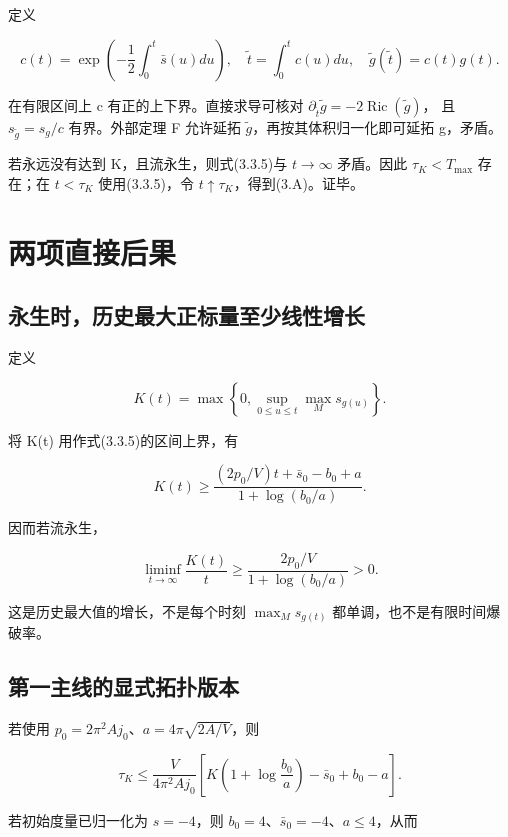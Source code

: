 \documentclass[UTF8,11pt,fontset=none]{ctexart}
\theoremstyle{definition}
\theoremstyle{remark}
\begin{document}
定义

\[
 c(t)=\exp\left(-\frac12\int_0^t\bar s(u)du\right),
 \quad \widetilde t=\int_0^t c(u)du,
 \quad \widetilde g(\widetilde t)=c(t)g(t).
\]

在有限区间上 c 有正的上下界。直接求导可核对 \(\partial_{\widetilde t}\widetilde g=-2\operatorname{Ric}(\widetilde g)\)， 且 \(s_{\widetilde g}=s_g/c\) 有界。外部定理 F 允许延拓 \(\widetilde g\)，再按其体积归一化即可延拓 g，矛盾。

若永远没有达到 K，且流永生，则式(3.3.5)与 \(t\to\infty\) 矛盾。因此 \(\tau_K<T_{\max}\) 存在；在 \(t<\tau_K\) 使用(3.3.5)，令 \(t\uparrow\tau_K\)，得到(3.A)。证毕。

\section{两项直接后果}\label{v3-ux4e24ux9879ux76f4ux63a5ux540eux679c}

\subsection{永生时，历史最大正标量至少线性增长}\label{v3-ux6c38ux751fux65f6ux5386ux53f2ux6700ux5927ux6b63ux6807ux91cfux81f3ux5c11ux7ebfux6027ux589eux957f}

定义

\[
 K(t)=\max\left\{0,\sup_{0\le u\le t}\max_Ms_{g(u)}\right\}.
\]

将 K(t) 用作式(3.3.5)的区间上界，有

\[
 \boxed{
 K(t)\ge
 \frac{(2p_0/V)t+\bar s_0-b_0+a}
 {1+\log(b_0/a)}.
 }
\tag{3.4.1}
\]

因而若流永生，

\[
 \liminf_{t\to\infty}\frac{K(t)}t
 \ge\frac{2p_0/V}{1+\log(b_0/a)}>0.
\]

这是历史最大值的增长，不是每个时刻 \(\max_Ms_{g(t)}\) 都单调，也不是有限时间爆破率。

\subsection{第一主线的显式拓扑版本}\label{v3-ux7b2cux4e00ux4e3bux7ebfux7684ux663eux5f0fux62d3ux6251ux7248ux672c}

若使用 \(p_0=2\pi^2Aj_0\)、\(a=4\pi\sqrt{2A/V}\)，则

\[
 \boxed{
 \tau_K\le\frac{V}{4\pi^2Aj_0}
 \left[K\left(1+\log\frac{b_0}{a}\right)-\bar s_0+b_0-a\right].
 }
\tag{3.4.2}
\]

若初始度量已归一化为 \(s=-4\)，则 \(b_0=4\)、\(\bar s_0=-4\)、\(a\le4\)，从而
\end{document}
